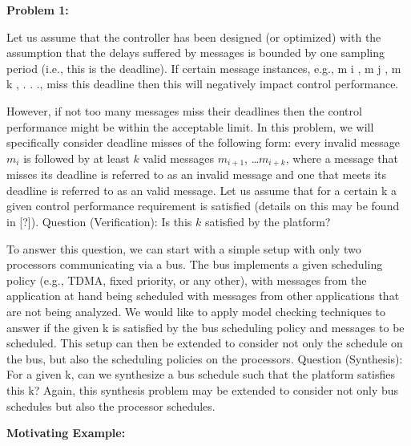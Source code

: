 

\textbf{Problem 1:}

Let us assume that the controller has been designed (or optimized) with the
assumption that the delays suffered by messages is bounded by one sampling
period (i.e., this is the deadline). If certain message instances, e.g., m i , m j ,
m k , . . ., miss this deadline then this will negatively impact control performance.

However, if not too many messages miss their deadlines then the control performance
might be within the acceptable limit.
In this problem, we will specifically consider deadline misses of the following
form:
every invalid message $m_i$ is followed by at least $k$ valid messages
$m_{i+1}$, \dots $m_{i+k}$,
where a message that misses its deadline is referred to as an invalid message
and one that meets its deadline is referred to as an valid message.
Let us assume that for a certain k a given control performance requirement
is satisfied (details on this may be found in [?]).
Question (Verification): Is this $k$ satisfied by the platform?

To answer this question, we can start with a simple setup with only two processors
communicating via a bus. The bus implements a given scheduling policy
(e.g., TDMA, fixed priority, or any other), with messages from the application
at hand being scheduled with messages from other applications that are not being 
analyzed. We would like to apply model checking techniques to answer if the
given k is satisfied by the bus scheduling policy and messages to be scheduled.
This setup can then be extended to consider not only the schedule on the
bus, but also the scheduling policies on the processors.
Question (Synthesis): For a given k, can we synthesize a bus schedule such
that the platform satisfies this k?
Again, this synthesis problem may be extended to consider not only bus
schedules but also the processor schedules.

\textbf{Motivating Example:}

